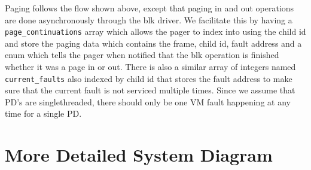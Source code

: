 \documentclass{article}
\begin{document}
\begin{figure}[H]
{}
\end{figure}
Paging follows the flow shown above, except that paging in and out operations are done asynchronously through the blk driver. We facilitate this by having a \texttt{page\_continuations} array which allows the pager to index into using the child id and store the paging data which contains the frame, child id, fault address and a enum which tells the pager when notified that the blk operation is finished whether it was a page in or out. There is also a similar array of integers named \texttt{current\_faults} also indexed by child id that stores the fault address to make sure that the current fault is not serviced multiple times. Since we assume that PD's are singlethreaded, there should only be one VM fault happening at any time for a single PD. 

\section{More Detailed System Diagram}
\end{document}
